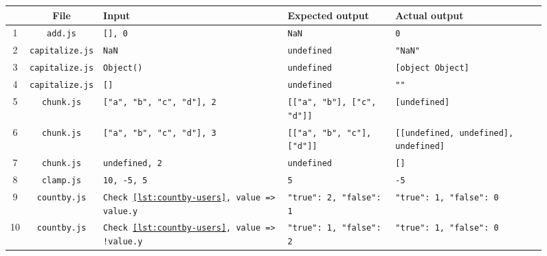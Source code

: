 \documentclass[]{article}
\begin{document}
\begin{figure}[H]
	\centering
	\begin{tabularx}{\textwidth}{c c X X X}
		\toprule
		   & File                   & Input                                                            & Expected output                   & Actual output                                \\
		\midrule
		1  & \texttt{add.js}        & \texttt{[], 0}                                                   & \texttt{NaN}                      & \texttt{0}                                   \\
		2  & \texttt{capitalize.js} & \texttt{NaN}                                                     & \texttt{undefined}                & \texttt{"NaN"}                               \\
		3  & \texttt{capitalize.js} & \texttt{Object()}                                                & \texttt{undefined}                & \texttt{[object Object]}                     \\
		4  & \texttt{capitalize.js} & \texttt{[]}                                                      & \texttt{undefined}                & \texttt{""}                                  \\
		5  & \texttt{chunk.js}      & \texttt{["a", "b", "c", "d"], 2}                                 & \texttt{[["a", "b"], ["c", "d"]]} & \texttt{[undefined]}                         \\
		6  & \texttt{chunk.js}      & \texttt{["a", "b", "c", "d"], 3}                                 & \texttt{[["a", "b", "c"], ["d"]]} & \texttt{[[undefined, undefined], undefined]} \\
		7  & \texttt{chunk.js}      & \texttt{undefined, 2}                                            & \texttt{undefined}                & \texttt{[]}                                  \\
		8  & \texttt{clamp.js}      & \texttt{10, -5, 5}                                               & \texttt{5}                        & \texttt{-5}                                  \\
		9  & \texttt{countby.js}    & \texttt{Check \ref{lst:countby-users}, value => value.y}         & \texttt{{"true": 2, "false": 1}}  & \texttt{{"true": 1, "false": 0}}             \\
		10 & \texttt{countby.js}    & \texttt{Check \ref{lst:countby-users}, value => !value.y}        & \texttt{{"true": 1, "false": 2}}  & \texttt{{"true": 1, "false": 0}}             \\

\end{tabularx}
\end{figure}
\end{document}
